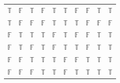 \documentclass[a4paper,12pt]{article}
\begin{document}
\begin{enumerate}
\begin{enumerate}
\begin{table}[htp]
\begin{tabular}{|c|c|c|c|c|c|c|c|c|c|}
$\mathbb{T}$ & $\mathbb{F}$ & $\mathbb{T}$ & $\mathbb{F}$ & $\mathbb{T}$ & $\mathbb{T}$       & $\mathbb{F}$                & $\mathbb{F}$ & $\mathbb{T}$             & $\mathbb{T}$                                                                                                                                                           \\
$\mathbb{T}$ & $\mathbb{F}$ & $\mathbb{F}$ & $\mathbb{F}$ & $\mathbb{T}$ & $\mathbb{T}$       & $\mathbb{T}$                & $\mathbb{F}$ & $\mathbb{F}$             & \cellcolor[HTML]{FFCCC9}$\mathbb{F}$                                                                                                                                   \\
$\mathbb{F}$ & $\mathbb{T}$ & $\mathbb{T}$ & $\mathbb{T}$ & $\mathbb{F}$ & $\mathbb{T}$       & $\mathbb{F}$                & $\mathbb{F}$ & $\mathbb{T}$             & $\mathbb{T}$                                                                                                                                                           \\
$\mathbb{F}$ & $\mathbb{T}$ & $\mathbb{F}$ & $\mathbb{T}$ & $\mathbb{F}$ & $\mathbb{T}$       & $\mathbb{T}$                & $\mathbb{F}$ & $\mathbb{T}$             & $\mathbb{T}$                                                                                                                                                           \\
$\mathbb{F}$ & $\mathbb{F}$ & $\mathbb{T}$ & $\mathbb{T}$ & $\mathbb{T}$ & $\mathbb{F}$       & $\mathbb{F}$                & $\mathbb{T}$ & $\mathbb{T}$             & $\mathbb{T}$                                                                                                                                                           \\
$\mathbb{F}$ & $\mathbb{F}$ & $\mathbb{F}$ & $\mathbb{T}$ & $\mathbb{T}$ & $\mathbb{F}$       & $\mathbb{T}$                & $\mathbb{T}$ & $\mathbb{T}$             & $\mathbb{T}$ \\\hline                                                                                                                                                         
\end{tabular}
\end{table}
\begin{table}[!htb]\centering
    \begin{minipage}{.2\linewidth}
      \centering
        \begin{tabular}{|c|c|c|}\hline

\end{tabular}
\end{minipage}
\end{table}
\end{enumerate}
\end{enumerate}
\end{document}
